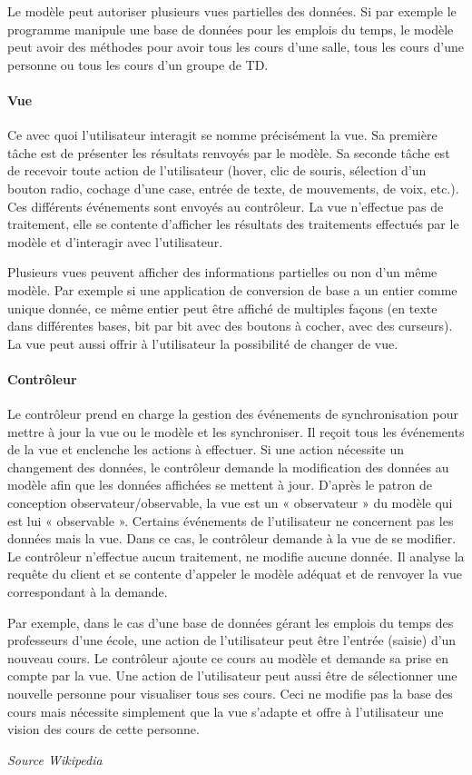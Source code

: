 \documentclass[a4paper,11pt,twoside]{report}
\begin{document}
  Le modèle peut autoriser plusieurs vues partielles des données. Si par exemple le programme manipule une base de données pour les emplois du temps, le modèle peut avoir des méthodes pour avoir tous les cours d'une salle, tous les cours d'une personne ou tous les cours d'un groupe de TD.

  \paragraph*{Vue}
  Ce avec quoi l'utilisateur interagit se nomme précisément la vue. Sa première tâche est de présenter les résultats renvoyés par le modèle. Sa seconde tâche est de recevoir toute action de l'utilisateur (hover, clic de souris, sélection d'un bouton radio, cochage d'une case, entrée de texte, de mouvements, de voix, etc.). Ces différents événements sont envoyés au contrôleur. La vue n'effectue pas de traitement, elle se contente d'afficher les résultats des traitements effectués par le modèle et d'interagir avec l'utilisateur.

  Plusieurs vues peuvent afficher des informations partielles ou non d'un même modèle. Par exemple si une application de conversion de base a un entier comme unique donnée, ce même entier peut être affiché de multiples façons (en texte dans différentes bases, bit par bit avec des boutons à cocher, avec des curseurs). La vue peut aussi offrir à l'utilisateur la possibilité de changer de vue.

  \paragraph*{Contrôleur}
  Le contrôleur prend en charge la gestion des événements de synchronisation pour mettre à jour la vue ou le modèle et les synchroniser. Il reçoit tous les événements de la vue et enclenche les actions à effectuer. Si une action nécessite un changement des données, le contrôleur demande la modification des données au modèle afin que les données affichées se mettent à jour. D'après le patron de conception observateur/observable, la vue est un « observateur » du modèle qui est lui « observable ». Certains événements de l'utilisateur ne concernent pas les données mais la vue. Dans ce cas, le contrôleur demande à la vue de se modifier. Le contrôleur n'effectue aucun traitement, ne modifie aucune donnée. Il analyse la requête du client et se contente d'appeler le modèle adéquat et de renvoyer la vue correspondant à la demande.

  Par exemple, dans le cas d'une base de données gérant les emplois du temps des professeurs d'une école, une action de l'utilisateur peut être l'entrée (saisie) d'un nouveau cours. Le contrôleur ajoute ce cours au modèle et demande sa prise en compte par la vue. Une action de l'utilisateur peut aussi être de sélectionner une nouvelle personne pour visualiser tous ses cours. Ceci ne modifie pas la base des cours mais nécessite simplement que la vue s'adapte et offre à l'utilisateur une vision des cours de cette personne.
  
  \begin{flushright}
    \footnotesize\textit{Source Wikipedia}
  \end{flushright}
  
\listoffigures
\thispagestyle{\chead{}}
\end{document}
